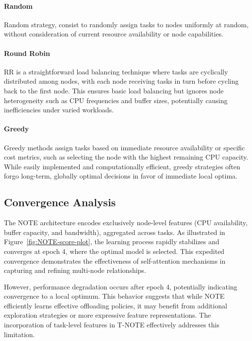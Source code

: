 \documentclass{svproc}
\begin{document}
\paragraph{Random}
Random strategy, consist to randomly assign tasks to nodes uniformly at random, without consideration of current resource availability or node capabilities.

\paragraph{Round Robin}
RR is a straightforward load balancing technique where tasks are cyclically distributed among nodes, with each node receiving tasks in turn before cycling back to the first node. This ensures basic load balancing but ignores node heterogeneity such as CPU frequencies and buffer sizes, potentially causing inefficiencies under varied workloads. 

\paragraph{Greedy}
Greedy methods assign tasks based on immediate resource availability or specific cost metrics, such as selecting the node with the highest remaining CPU capacity. While easily implemented and computationally efficient, greedy strategies often forgo long-term, globally optimal decisions in favor of immediate local optima.




\subsection{Convergence Analysis}

The NOTE architecture encodes exclusively node-level features (CPU availability, buffer capacity, and bandwidth), aggregated across tasks. As illustrated in Figure~\ref{fig:NOTE-score-plot}, the learning process rapidly stabilizes and converges at epoch 4, where the optimal model is selected. This expedited convergence demonstrates the effectiveness of self-attention mechanisms in capturing and refining multi-node relationships.


However, performance degradation occurs after epoch 4, potentially indicating convergence to a local optimum. This behavior suggests that while NOTE efficiently learns effective offloading policies, it may benefit from additional exploration strategies or more expressive feature representations. The incorporation of task-level features in T-NOTE effectively addresses this limitation.
\end{document}
